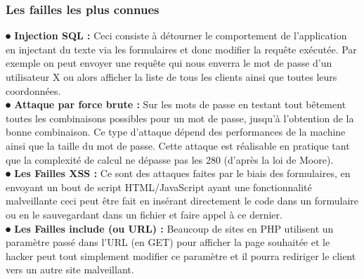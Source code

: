 \documentclass{article}
\begin{document}
\subsubsection{Les failles les plus connues}
\textbf{⦁ Injection SQL :} Ceci consiste à détourner le comportement de l’application en injectant du texte via les formulaires et donc modifier la requête exécutée. Par exemple on peut envoyer une requête qui nous enverra le mot de passe d’un utilisateur X ou alors afficher la liste de tous les clients ainsi que toutes leurs coordonnées. \\
\textbf{⦁ Attaque par force brute :} Sur les mots de passe en testant tout bêtement toutes les combinaisons possibles pour un mot de passe, jusqu’à l’obtention de la bonne combinaison. Ce type d’attaque dépend des performances de la machine ainsi que la taille du mot de passe. Cette attaque est réalisable en pratique tant que la complexité de calcul ne dépasse pas les 280 (d’après la loi de Moore). \\
\textbf{⦁ Les Failles XSS :} Ce sont des attaques faites par le biais des formulaires, en envoyant un bout de script HTML/JavaScript ayant une fonctionnalité malveillante ceci peut être fait en insérant directement le code dans un formulaire ou en le sauvegardant dans un fichier et faire appel à ce dernier. \\
\textbf{⦁ Les Failles include (ou URL) :} Beaucoup de sites en PHP utilisent un paramètre passé dans l’URL (en GET) pour afficher la page souhaitée et le hacker peut tout simplement modifier ce paramètre et il pourra rediriger le client vers un autre site malveillant. \\
\end{document}
